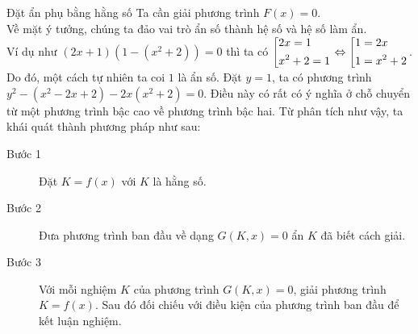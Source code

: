 \begin{dang}{Đặt ẩn phụ bằng hằng số}
	\noindent Ta cần giải phương trình $ F(x)=0 $.\\
	Về mặt ý tưởng, chúng ta đảo vai trò ẩn số thành hệ số và hệ số làm ẩn. \\Ví dụ như $ (2x+1)(1-(x^2+2))=0 $ thì ta có $ \left[\begin{aligned}& 2x=1 \\ & x^2+2=1\end{aligned}\right. \Leftrightarrow \left[\begin{aligned}& 1=2x\\ & 1=x^2+2\end{aligned}\right. $. Do đó, một cách tự nhiên ta coi $ 1 $ là ẩn số. Đặt $ y=1 $, ta có phương trình $ y^2-(x^2-2x+2)-2x(x^2+2)=0 $. Điều này có rất có ý nghĩa ở chỗ chuyển từ một phương trình bậc cao về phương trình bậc hai. Từ phân tích như vậy, ta khái quát thành phương pháp như sau:
		\begin{description}
			\item[Bước 1] Đặt $ K=f(x)$ với $ K $ là hằng số.
			\item[Bước 2] Đưa phương trình ban đầu về dạng $ G(K,x)=0 $ ẩn $ K $ đã biết cách giải.
			\item[Bước 3] Với mỗi nghiệm $ K$ của phương trình $ G(K,x)=0 $,  giải phương trình $ K=f(x)$. Sau đó đối  chiếu với điều kiện của phương trình ban đầu để kết luận nghiệm.
		\end{description}
\end{dang}

